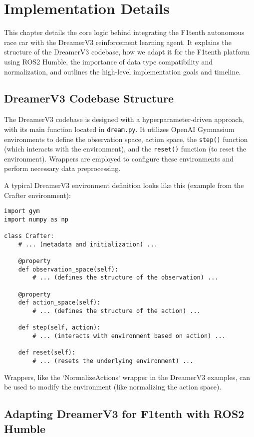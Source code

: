 \chapter{Implementation Details}

This chapter details the core logic behind integrating the F1tenth autonomous race car with the DreamerV3 reinforcement learning agent. It explains the structure of the DreamerV3 codebase, how we adapt it for the F1tenth platform using ROS2 Humble, the importance of data type compatibility and normalization, and outlines the high-level implementation goals and timeline.

\section{DreamerV3 Codebase Structure}

The DreamerV3 codebase is designed with a hyperparameter-driven approach, with its main function located in \texttt{dream.py}.  It utilizes OpenAI Gymnasium environments to define the observation space, action space, the \texttt{step()} function (which interacts with the environment), and the \texttt{reset()} function (to reset the environment).  Wrappers are employed to configure these environments and perform necessary data preprocessing.

A typical DreamerV3 environment definition looks like this (example from the Crafter environment):

\begin{verbatim}
import gym
import numpy as np

class Crafter:
    # ... (metadata and initialization) ...

    @property
    def observation_space(self):
        # ... (defines the structure of the observation) ...

    @property
    def action_space(self):
        # ... (defines the structure of the action) ...

    def step(self, action):
        # ... (interacts with environment based on action) ...

    def reset(self):
        # ... (resets the underlying environment) ...
\end{verbatim}

Wrappers, like the `NormalizeActions` wrapper in the DreamerV3 examples, can be used to modify the environment (like normalizing the action space).

\section{Adapting DreamerV3 for F1tenth with ROS2 Humble}

